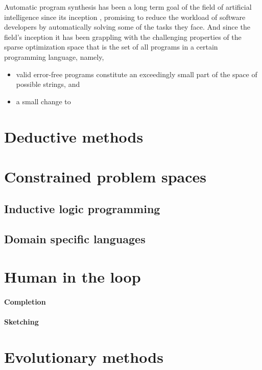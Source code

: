Automatic program synthesis has been a long term goal of the field of artificial intelligence since its inception \cite{mannaAutomaticProgramSynthesis1971}, promising to reduce the workload of software developers by automatically solving some of the tasks they face.
And since the field's inception it has been grappling with the challenging properties of the sparse optimization space that is the set of all programs in a certain programming language, namely, 
\begin{itemize}
    \item valid error-free programs constitute an exceedingly small part of the space of possible strings, and
    \item a small change to 
\end{itemize}

\section{Deductive methods}

\section{Constrained problem spaces}

\subsection{Inductive logic programming}

\subsection{Domain specific languages}

\section{Human in the loop}

\paragraph{Completion}

\paragraph{Sketching}

\section{Evolutionary methods}

